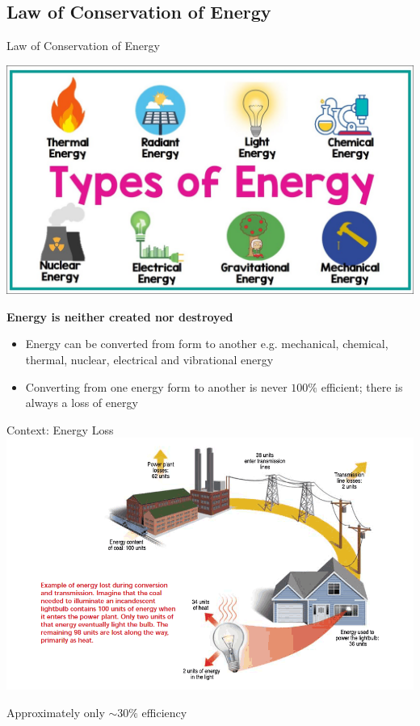\documentclass[11pt]{beamer}
\begin{document}
\subsection{Law of Conservation of Energy}

\begin{frame}{Law of Conservation of Energy}
  \begin{center}
    \includegraphics[scale=0.15]{energy_types}
    
    \textbf{Energy is neither created nor destroyed}
  \end{center}

  \begin{itemize}
  \item Energy can be converted from form to another
    e.g. mechanical, chemical, thermal, nuclear,
    electrical and vibrational energy
  \item Converting from one energy form to another is
    never $100\%$ efficient; there is always a loss of
    energy
  \end{itemize}
\end{frame}

\begin{frame}{Context: Energy Loss}
  \centering
  \includegraphics[width=0.9\linewidth]{energy_loss}

  Approximately only $\sim 30\%$ efficiency
\end{frame}
\end{document}
